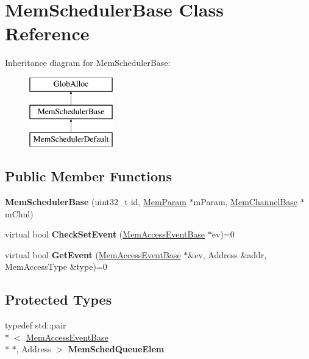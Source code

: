 \hypertarget{classMemSchedulerBase}{\section{Mem\-Scheduler\-Base Class Reference}
\label{classMemSchedulerBase}
}
Inheritance diagram for Mem\-Scheduler\-Base\-:\begin{figure}[H]
\begin{center}
\leavevmode
\includegraphics[height=3.000000cm]{classMemSchedulerBase}
\end{center}
\end{figure}
\subsection*{Public Member Functions}
\begin{DoxyCompactItemize}
\item 
\hypertarget{classMemSchedulerBase_a070bebd70da76419ba0096099c9fe71b}{{\bfseries Mem\-Scheduler\-Base} (uint32\-\_\-t id, \hyperlink{classMemParam}{Mem\-Param} $\ast$m\-Param, \hyperlink{classMemChannelBase}{Mem\-Channel\-Base} $\ast$m\-Chnl)}\label{classMemSchedulerBase_a070bebd70da76419ba0096099c9fe71b}

\item 
\hypertarget{classMemSchedulerBase_a4c2e1b1a58fc99325b084f7cd4b0c501}{virtual bool {\bfseries Check\-Set\-Event} (\hyperlink{classMemAccessEventBase}{Mem\-Access\-Event\-Base} $\ast$ev)=0}\label{classMemSchedulerBase_a4c2e1b1a58fc99325b084f7cd4b0c501}

\item 
\hypertarget{classMemSchedulerBase_a36a062d1c9a452088437e5f712fe13a9}{virtual bool {\bfseries Get\-Event} (\hyperlink{classMemAccessEventBase}{Mem\-Access\-Event\-Base} $\ast$\&ev, Address \&addr, Mem\-Access\-Type \&type)=0}\label{classMemSchedulerBase_a36a062d1c9a452088437e5f712fe13a9}

\end{DoxyCompactItemize}
\subsection*{Protected Types}
\begin{DoxyCompactItemize}
\item 
\hypertarget{classMemSchedulerBase_acafdeb002bbb399b4589ce1b709d9c33}{typedef std\-::pair\\*
$<$ \hyperlink{classMemAccessEventBase}{Mem\-Access\-Event\-Base} \\*
$\ast$, Address $>$ {\bfseries Mem\-Sched\-Queue\-Elem}}\label{classMemSchedulerBase_acafdeb002bbb399b4589ce1b709d9c33}

\end{DoxyCompactItemize}
